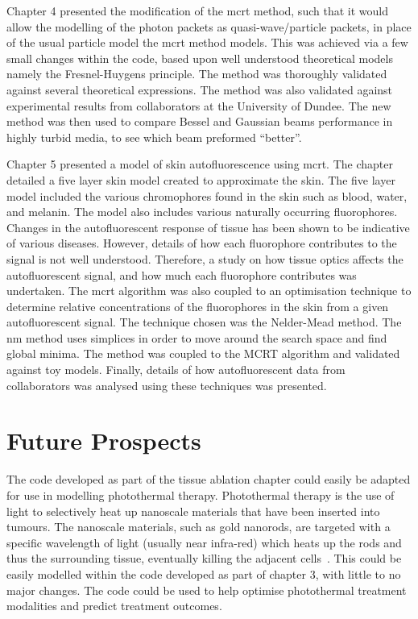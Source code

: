 \medskip

Chapter 4 presented the modification of the \gls*{mcrt} method, such that it would allow the modelling of the photon packets as quasi-wave/particle packets, in place of the usual particle model the \gls*{mcrt} method models.
This was achieved via a few small changes within the code, based upon well understood theoretical models namely the Fresnel-Huygens principle.
The method was thoroughly validated against several theoretical expressions.
The method was also validated against experimental results from collaborators at the University of Dundee.
The new method was then used to compare Bessel and Gaussian beams performance in highly turbid media, to see which beam preformed ``better''.
\medskip

Chapter 5 presented a model of skin autofluorescence using \gls*{mcrt}.
The chapter detailed a five layer skin model created to approximate the skin.
The five layer model included the various chromophores found in the skin such as blood, water, and melanin.
The model also includes various naturally occurring fluorophores.
Changes in the autofluorescent response of tissue has been shown to be indicative of various diseases.
However, details of how each fluorophore contributes to the signal is not well understood.
Therefore, a study on how tissue optics affects the autofluorescent signal, and how much each fluorophore contributes was undertaken.
The \gls*{mcrt} algorithm was also coupled to an optimisation technique to determine relative concentrations of the fluorophores in the skin from a given autofluorescent signal.
The technique chosen was the Nelder-Mead method.
The \gls*{nm} method uses simplices in order to move around the search space and find global minima.
The method was coupled to the MCRT algorithm and validated against toy models.
Finally, details of how autofluorescent data from collaborators was analysed using these techniques was presented.

\section{Future Prospects}

The code developed as part of the tissue ablation chapter could easily be adapted for use in modelling photothermal therapy.
Photothermal therapy is the use of light to selectively heat up nanoscale materials that have been inserted into tumours.
The nanoscale materials, such as gold nanorods, are targeted with a specific wavelength of light (usually near infra-red) which heats up the rods and thus the surrounding tissue, eventually killing the adjacent cells~\cite{singh2016application,gallina2016aptamer}.
This could be easily modelled within the code developed as part of chapter 3, with little to no major changes.
The code could be used to help optimise photothermal treatment modalities and predict treatment outcomes.

